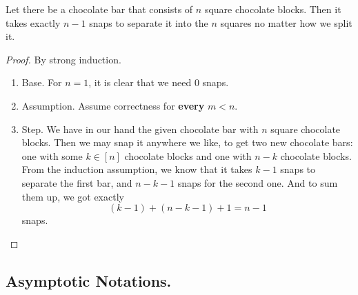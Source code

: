 
\begin{example} 
  \label{example:chockstrong}
  Let there be a chocolate bar that consists of \(n\) square chocolate blocks. Then it takes exactly \(n - 1\) snaps to separate it into the \(n\) squares no matter how we split it.

  \begin{proof} By strong induction. 
    \begin{enumerate}
      \item	Base. For \(n = 1\), it is clear that we need \(0\) snaps. 
      \item	Assumption. Assume correctness for \textbf{every} \(m < n \).
      \item	Step. We have in our hand the given chocolate bar with \(n\) square chocolate blocks. Then we may snap it anywhere we like, to get two new chocolate bars: one with some \( k \in [n]\) chocolate blocks and one with \(n - k\) chocolate blocks. From the induction assumption, we know that it takes \(k - 1\) snaps to separate the first bar, and \(n - k - 1\) snaps for the second one. And to sum them up, we got exactly \[ (k - 1) + (n - k - 1) + 1 = n - 1 \] snaps.
    \end{enumerate}
\end{proof}
\end{example}
\subsection{Asymptotic Notations.}



